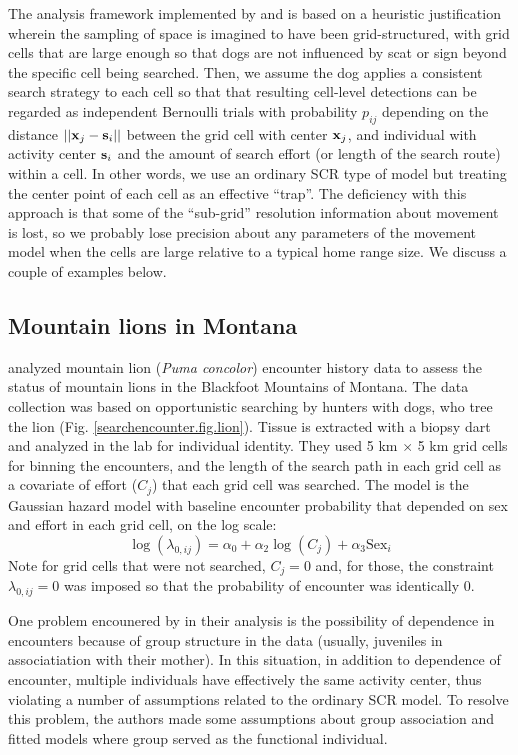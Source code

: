 The analysis framework implemented by \citet{thompson_etal:2012} and
\citet{russell_etal:2012} is based on a heuristic justification
wherein the sampling of space is imagined to have been
grid-structured, with grid cells that are large enough so that dogs
are not influenced by scat or sign beyond the specific cell being
searched. Then, we assume the dog applies a consistent search strategy
to each cell so that that resulting cell-level detections can be
regarded as independent Bernoulli trials with probability $p_{ij}$
depending on the distance $||{\bf x}_j - {\bf s}_{i}||$ between the
grid cell with center ${\bf x}_{j}$, and individual with activity
center ${\bf s}_{i}$ and the amount of search effort (or length of the
search route) within a cell.  In other words, we use an ordinary SCR
type of model but treating the center point of each cell as an
effective ``trap''.  The deficiency with this approach is that some of
the ``sub-grid'' resolution information about movement is lost, so we
probably lose precision about any parameters of the movement model
when the cells are large relative to a typical home range size. We
discuss a couple of examples below.

\subsection{Mountain lions in Montana}

\citet{russell_etal:2012} analyzed mountain lion ({\it Puma concolor})
encounter history data to assess the status of mountain lions in the
Blackfoot Mountains of Montana.  The data collection was based on
opportunistic searching by hunters with dogs, who tree the lion
(Fig. \ref{searchencounter.fig.lion}).  Tissue is extracted with a
biopsy dart and analyzed in the lab for individual identity.  They
used 5 km $\times$ 5 km grid cells for binning the encounters, and the
length of the search path in each grid cell as a covariate of effort
($C_j$) that each grid cell was searched.  The model is the Gaussian
hazard model with baseline encounter probability that depended on sex
and effort in each grid cell, on the log scale:
\[
 \log(\lambda_{0,ij}) = \alpha_{0} + \alpha_{2} \log(C_{j}) + \alpha_{3} \mbox{Sex}_{i}
\]
Note for grid cells that were not searched, $C_{j} =0$ and, for those,
the constraint $\lambda_{0,ij}=0$ was imposed so that the probability
of encounter was identically 0.

One problem encounered by \citet{russell_etal:2012} in their analysis
is the possibility of dependence in encounters because of group
structure in the data (usually, juveniles in associatiation with their
mother). In this situation, in addition to dependence of encounter,
multiple individuals have effectively the same activity center, thus
violating a number of assumptions related to the ordinary SCR model.
To resolve this problem, the authors made some assumptions about group
association and fitted models where group served as the functional
individual.

